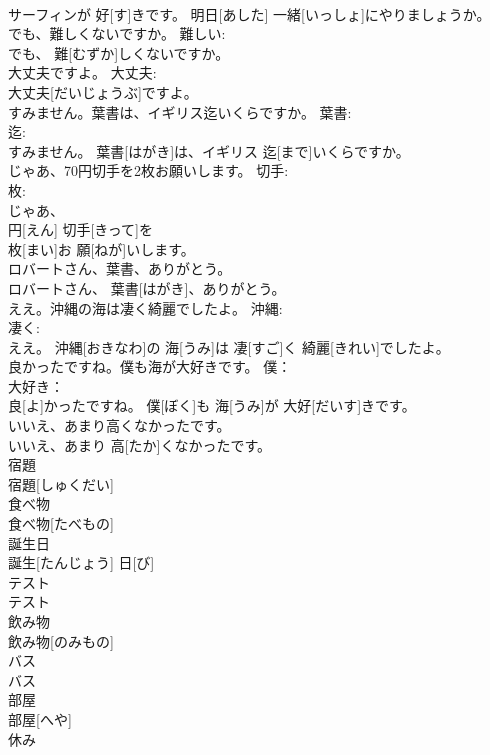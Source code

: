 \documentclass[8pt]{extreport}
\begin{document}
\begin{CJK}{UTF8}{min}
\\	サーフィンが 好[す]きです。 明日[あした] 一緒[いっしょ]にやりましょうか。		
\\	でも、難しくないですか。	難しい: 
\\	でも、 難[むずか]しくないですか。		
\\	大丈夫ですよ。	大丈夫: 
\\	大丈夫[だいじょうぶ]ですよ。		
\\	すみません。葉書は、イギリス迄いくらですか。	葉書: 
\\	迄: 
\\	すみません。 葉書[はがき]は、イギリス 迄[まで]いくらですか。		
\\	じゃあ、70円切手を2枚お願いします。	切手: 
\\	枚: 
\\	じゃあ、 
\\	円[えん] 切手[きって]を 
\\	枚[まい]お 願[ねが]いします。		
\\	ロバートさん、葉書、ありがとう。	
\\	ロバートさん、 葉書[はがき]、ありがとう。		
\\	ええ。沖縄の海は凄く綺麗でしたよ。	沖縄: 
\\	凄く: 
\\	ええ。 沖縄[おきなわ]の 海[うみ]は 凄[すご]く 綺麗[きれい]でしたよ。		
\\	良かったですね。僕も海が大好きです。	僕： 
\\	大好き：
\\	良[よ]かったですね。 僕[ぼく]も 海[うみ]が 大好[だいす]きです。		
\\	いいえ、あまり高くなかったです。	
\\	いいえ、あまり 高[たか]くなかったです。	
\\	宿題	
\\	宿題[しゅくだい]		
\\	食べ物	
\\	食べ物[たべもの]		
\\	誕生日	
\\	誕生[たんじょう] 日[び]		
\\	テスト	
\\	テスト		
\\	飲み物	
\\	飲み物[のみもの]		
\\	バス	
\\	バス		
\\	部屋	
\\	部屋[へや]		
\\	休み	

\end{CJK}
\end{document}
